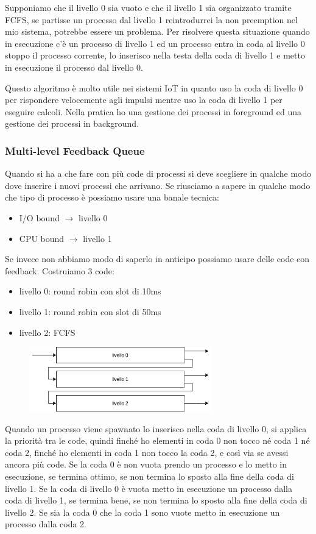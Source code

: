 Supponiamo che il livello 0 sia vuoto e che il livello 1 sia organizzato tramite FCFS, se partisse un processo dal livello 1 reintrodurrei la non preemption nel mio sistema, potrebbe essere un problema. Per risolvere questa situazione quando in esecuzione c'è un processo di livello 1 ed un processo entra in coda al livello 0 stoppo il processo corrente, lo inserisco nella testa della coda di livello 1 e metto in esecuzione il processo dal livello 0.

Questo algoritmo è molto utile nei sistemi IoT in quanto uso la coda di livello 0 per rispondere velocemente agli impulsi mentre uso la coda di livello 1 per eseguire calcoli. Nella pratica ho una gestione dei processi in foreground ed una gestione dei processi in background.

\subsubsection{Multi-level Feedback Queue}
Quando si ha a che fare con più code di processi si deve scegliere in qualche modo dove inserire i nuovi processi che arrivano.
Se riusciamo a sapere in qualche modo che tipo di processo è possiamo usare una banale tecnica:
\begin{itemize}
    \item I/O bound $\xrightarrow{}$ livello 0
    \item CPU bound $\xrightarrow{}$ livello 1
\end{itemize}
Se invece non abbiamo modo di saperlo in anticipo possiamo usare delle code con feedback.
Costruiamo 3 code:
\begin{itemize}
    \item livello 0: round robin con slot di 10ms
    \item livello 1: round robin con slot di 50ms
    \item livello 2: FCFS
\end{itemize}
\begin{figure}[H]
    \centering
    \includegraphics[width=300px]{images/4_Scheduling/feedback_queue.png}
\end{figure}
Quando un processo viene spawnato lo inserisco nella coda di livello 0, si applica la priorità tra le code, quindi finché ho elementi in coda 0 non tocco né coda 1 né coda 2, finché ho elementi in coda 1 non tocco la coda 2, e così via se avessi ancora più code.
Se la coda 0 è non vuota prendo un processo e lo metto in esecuzione, se termina ottimo, se non termina lo sposto alla fine della coda di livello 1.
Se la coda di livello 0 è vuota metto in esecuzione un processo dalla coda di livello 1, se termina bene, se non termina lo sposto alla fine della coda di livello 2.
Se sia la coda 0 che la coda 1 sono vuote metto in esecuzione un processo dalla coda 2.

